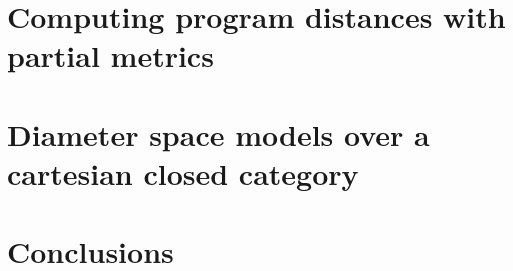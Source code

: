 \documentclass[a4paper,UKenglish,cleveref, autoref, english, thm-restate]{lipics-v2019}
\begin{document}


\section{Computing program distances with partial metrics}



\section{Diameter space models over a cartesian closed category}



\section{Conclusions}




%



%
%
%
%
%
%
%
\end{document}
